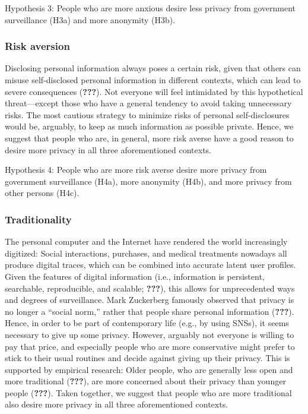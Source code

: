 \documentclass[man]{apa6}
\theoremstyle{definition}
\theoremstyle{definition}
\theoremstyle{definition}
\theoremstyle{remark}
\begin{document}
Hypothesis 3: People who are more anxious desire less privacy from
government surveillance (H3a) and more anonymity (H3b).

\hypertarget{risk-aversion}{%
\subsubsection{Risk aversion}\label{risk-aversion}}

Disclosing personal information always poses a certain risk, given that
others can misuse self-disclosed personal information in different
contexts, which can lead to severe consequences ({\textbf{???}}). Not
everyone will feel intimidated by this hypothetical threat---except
those who have a general tendency to avoid taking unnecessary risks. The
most cautious strategy to minimize risks of personal self-disclosures
would be, arguably, to keep as much information as possible private.
Hence, we suggest that people who are, in general, more risk averse have
a good reason to desire more privacy in all three aforementioned
contexts.

Hypothesis 4: People who are more risk averse desire more privacy from
government surveillance (H4a), more anonymity (H4b), and more privacy
from other persons (H4c).

\hypertarget{traditionality}{%
\subsubsection{Traditionality}\label{traditionality}}

The personal computer and the Internet have rendered the world
increasingly digitized: Social interactions, purchases, and medical
treatments nowadays all produce digital traces, which can be combined
into accurate latent user profiles. Given the features of digital
information (i.e., information is persistent, searchable, reproducible,
and scalable; {\textbf{???}}), this allows for unprecedented ways and
degrees of surveillance. Mark Zuckerberg famously observed that privacy
is no longer a \enquote{social norm,} rather that people share personal
information ({\textbf{???}}). Hence, in order to be part of contemporary
life (e.g., by using SNSs), it seems necessary to give up some privacy.
However, arguably not everyone is willing to pay that price, and
especially people who are more conservative might prefer to stick to
their usual routines and decide against giving up their privacy. This is
supported by empirical research: Older people, who are generally less
open and more traditional ({\textbf{???}}), are more concerned about
their privacy than younger people ({\textbf{???}}). Taken together, we
suggest that people who are more traditional also desire more privacy in
all three aforementioned contexts.
\end{document}
